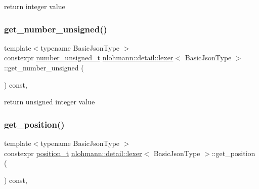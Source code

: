 return integer value 

\mbox{\label{classnlohmann_1_1detail_1_1lexer_a56640fb92293e0c17742ca3c814d74d6}} 
\subsubsection{\texorpdfstring{get\_number\_unsigned()}{get\_number\_unsigned()}}
{\footnotesize\ttfamily template$<$typename Basic\+Json\+Type $>$ \\
constexpr \mbox{\hyperlink{classnlohmann_1_1detail_1_1lexer_a105d1dfeab414a572655895cdd96a52a}{number\+\_\+unsigned\+\_\+t}} \mbox{\hyperlink{classnlohmann_1_1detail_1_1lexer}{nlohmann\+::detail\+::lexer}}$<$ Basic\+Json\+Type $>$\+::get\+\_\+number\+\_\+unsigned (\begin{DoxyParamCaption}{ }\end{DoxyParamCaption}) const\hspace{0.3cm}{\ttfamily [inline]}, {\ttfamily [noexcept]}}



return unsigned integer value 

\mbox{\label{classnlohmann_1_1detail_1_1lexer_abf5143501435f9f79898c1ff238c2622}} 
\subsubsection{\texorpdfstring{get\_position()}{get\_position()}}
{\footnotesize\ttfamily template$<$typename Basic\+Json\+Type $>$ \\
constexpr \mbox{\hyperlink{structnlohmann_1_1detail_1_1position__t}{position\+\_\+t}} \mbox{\hyperlink{classnlohmann_1_1detail_1_1lexer}{nlohmann\+::detail\+::lexer}}$<$ Basic\+Json\+Type $>$\+::get\+\_\+position (\begin{DoxyParamCaption}{ }\end{DoxyParamCaption}) const\hspace{0.3cm}{\ttfamily [inline]}, {\ttfamily [noexcept]}}



